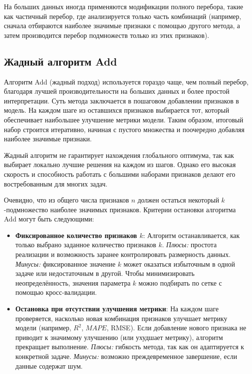 На больших данных иногда применяются модификации полного перебора, такие как частичный перебор, где анализируется только часть комбинаций (например, сначала отбираются наиболее значимые признаки с помощью другого метода, а затем производится перебор подмножеств только из этих признаков).

\subsection{Жадный алгоритм Add}

Алгоритм Add (жадный подход) используется гораздо чаще, чем полный перебор, благодаря лучшей производительности на больших данных и более простой интерпретации. Суть метода заключается в пошаговом добавлении признаков в модель. На каждом шаге из оставшихся признаков выбирается тот, который обеспечивает наибольшее улучшение метрики модели. Таким образом, итоговый набор строится итеративно, начиная с пустого множества и поочередно добавляя наиболее значимые признаки.

Жадный алгоритм не гарантирует нахождения глобального оптимума, так как выбирает локально лучшие решения на каждом из шагов. Однако его высокая скорость и способность работать с большими наборами признаков делают его востребованным для многих задач.

Очевидно, что из общего числа признаков $n$ должен остаться некоторый $k$-подмножество наиболее значимых признаков. Критерии остановки алгоритма Add могут быть следующими:

\begin{itemize}
    \item \textbf{Фиксированное количество признаков $k$}:  
    Алгоритм останавливается, как только выбрано заданное количество признаков $k$.  
    \textit{Плюсы:} простота реализации и возможность заранее контролировать размерность данных.  
    \textit{Минусы:} фиксированное значение $k$ может оказаться избыточным в одной задаче или недостаточным в другой. Чтобы минимизировать неопределённость, значения параметра $k$ можно подбирать по сетке с помощью кросс-валидации.
    
    \item \textbf{Остановка при отсутствии улучшения метрики}:  
    На каждом шаге проверяется, насколько новая комбинация признаков улучшает метрику модели (например, \(R^2\), \(MAPE\), RMSE). Если добавление нового признака не приводит к значимому улучшению (или ухудшает метрику), алгоритм прекращает выполнение.  
    \textit{Плюсы:} гибкость метода, так как он адаптируется к конкретной задаче.  
    \textit{Минусы:} возможно преждевременное завершение, если данные содержат шум.
\end{itemize}

